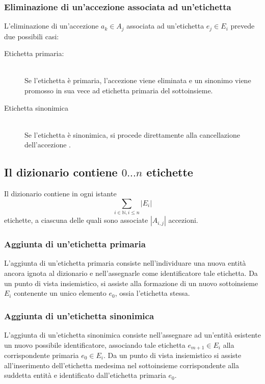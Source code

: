 \documentclass[10pt,a4paper,headinclude,footinclude,hidelinks]{scrreprt} %
\begin{document}
	\subsubsection{Eliminazione di un'accezione associata ad un'etichetta}
	L'eliminazione di un'accezione $a_k \in A_j$ associata ad un'etichetta $e_j \in E_i$ prevede due possibili casi:
	\begin{description}
	\item[Etichetta primaria:] \hfill \\
	Se l'etichetta è primaria, l'accezione viene eliminata e un sinonimo viene promosso in sua vece ad etichetta primaria del sottoinsieme.
 	\item[Etichetta sinonimica] \hfill \\
	Se l'etichetta è sinonimica, si procede direttamente alla cancellazione dell'accezione	.
	\end{description}

	\subsection[Dizionario]{Il dizionario contiene $0...n$ etichette}
	Il dizionario contiene in ogni istante $$\sum_{i \in \mathbb{N}, i \leq n}\left|E_i\right|$$ etichette, a ciascuna delle quali sono associate $\left|A_{i,j}\right|$ accezioni.

	\subsubsection{Aggiunta di un'etichetta primaria}
	L'aggiunta di un'etichetta primaria consiste nell'individuare una nuova entità ancora ignota al dizionario e nell'assegnarle come identificatore tale etichetta. Da un punto di vista insiemistico, si assiste alla formazione di un nuovo sottoinsieme $E_i$ contenente un unico elemento $e_0$, ossia l'etichetta stessa.
	
	\subsubsection{Aggiunta di un'etichetta sinonimica}
	L'aggiunta di un'etichetta sinonimica consiste nell'assegnare ad un'entità esistente un nuovo possibile identificatore, associando tale etichetta $e_{m+1} \in E_i$ alla corrispondente primaria $e_0 \in E_i$. Da un punto di vista insiemistico si assiste all'inserimento dell'etichetta medesima nel sottoinsieme corrispondente alla suddetta entità e identificato dall'etichetta primaria $e_0$.
\end{document}
